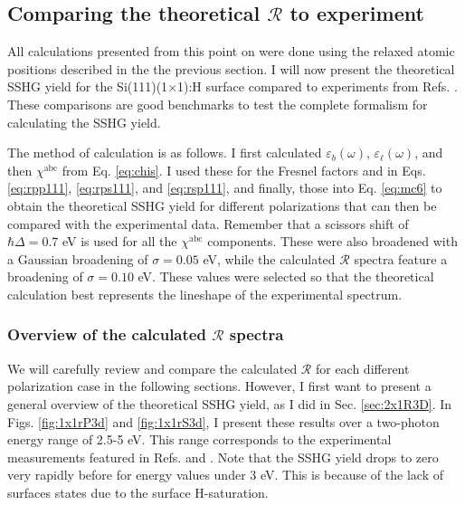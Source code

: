 
\subsection{Comparing the theoretical \texorpdfstring{$\mathcal{R}$}{R} to
experiment}
\label{sec:1x1sshgyield}

All calculations presented from this point on were done using the relaxed atomic
positions described in the the previous section. I will now present the
theoretical SSHG yield for the Si(111)(1$\times$1):H surface compared to
experiments from Refs. \cite{mitchellSS01, mejiaPRB02, bergfeldPRL04}. These
comparisons are good benchmarks to test the complete formalism for calculating
the SSHG yield.

The method of calculation is as follows. I first calculated
$\varepsilon_{b}(\omega)$, $\varepsilon_{\ell}(\omega)$, and then
$\chi^{\mathrm{abc}}$ from Eq. \eqref{eq:chis}. I used these for the Fresnel
factors and in Eqs. \eqref{eq:rpp111}, \eqref{eq:rps111}, and \eqref{eq:rsp111},
and finally, those into Eq. \eqref{eq:mc6} to obtain the theoretical SSHG yield
for different polarizations that can then be compared with the experimental
data. Remember that a scissors shift of $\hbar\Delta = 0.7$ eV is used for all
the $\chi^{\mathrm{abc}}$ components. These were also broadened with a Gaussian
broadening of $\sigma=0.05$ eV, while the calculated ${\mathcal{R}}$ spectra
feature a broadening of $\sigma=0.10$ eV. These values were selected so that the
theoretical calculation best represents the lineshape of the experimental
spectrum.



\subsubsection{Overview of the calculated \texorpdfstring{$\mathcal{R}$}{R}
spectra}\label{sec:1x1R3D}

We will carefully review and compare the calculated $\mathcal{R}$ for each
different polarization case in the following sections. However, I first want to
present a general overview of the theoretical SSHG yield, as I did in Sec.
\ref{sec:2x1R3D}. In Figs. \ref{fig:1x1rP3d} and \ref{fig:1x1rS3d}, I present
these results over a two-photon energy range of 2.5-5 eV. This range corresponds
to the experimental measurements featured in Refs. \cite{mejiaPRB02} and
\cite{bergfeldPRL04}. Note that the SSHG yield drops to zero very rapidly before
for energy values under 3 eV. This is because of the lack of surfaces states due
to the surface H-saturation.

